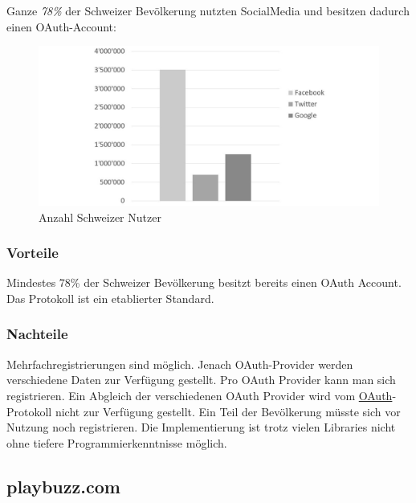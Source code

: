 Ganze \emph{78\%} \autocite{goldbachsocial} der Schweizer Bevölkerung
nutzten SocialMedia und besitzen dadurch einen OAuth-Account:

\begin{figure}[htbp]
\centering
\includegraphics{images/excel-statistik/socialmedia-schweiz.jpg}
\caption[Anzahl Schweizer Nutzer ]{Anzahl Schweizer Nutzer
\footnotemark{}}
\end{figure}

\newpage

\subsubsection{Vorteile}\label{vorteile}

Mindestes 78\% der Schweizer Bevölkerung besitzt bereits einen OAuth
Account. Das Protokoll ist ein etablierter Standard.

\subsubsection{Nachteile}\label{nachteile}

Mehrfachregistrierungen sind möglich. Jenach OAuth-Provider werden
verschiedene Daten zur Verfügung gestellt. Pro OAuth Provider kann man
sich registrieren. Ein Abgleich der verschiedenen OAuth Provider wird
vom \protect\hyperlink{oauth-1}{OAuth}-Protokoll nicht zur Verfügung
gestellt. Ein Teil der Bevölkerung müsste sich vor Nutzung noch
registrieren. Die Implementierung ist trotz vielen Libraries nicht ohne
tiefere Programmierkenntnisse möglich.

\newpage

\subsection{playbuzz.com}\label{playbuzz.com}

